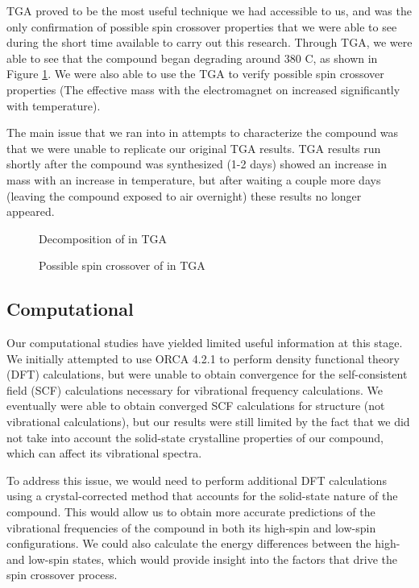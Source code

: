 \documentclass[journal=jacsat,manuscript=communication]{achemso}
\newcommand*\compound{\ch{Co(phen)2(NCS)2} }
\begin{document}
TGA proved to be the most useful technique we had accessible to us, and was the only confirmation of possible spin crossover properties that we were able to see during the short time available to carry out this research.  Through TGA, we were able to see that the compound began degrading around 380 \degree C, as shown in Figure \ref{fig:decomposition}. We were also able to use the TGA to verify possible spin crossover properties (The effective mass with the electromagnet on increased significantly with temperature).  

The main issue that we ran into in attempts to characterize the compound was that we were unable to replicate our original TGA results.  TGA results run shortly after the compound was synthesized (1-2 days) showed an increase in mass with an increase in temperature, but after waiting a couple more days (leaving the compound exposed to air overnight) these results no longer appeared.  

\begin{figure}
  \caption{Decomposition of \compound in TGA}
  \label{fig:decomposition}
\end{figure}

\begin{figure}
	\caption{Possible spin crossover of \compound in TGA}
	\label{fig:TGA_crossover}
\end{figure}

\subsection{Computational}

Our computational studies have yielded limited useful information at this stage. We initially attempted to use ORCA 4.2.1 to perform density functional theory (DFT) calculations, but were unable to obtain convergence for the self-consistent field (SCF) calculations necessary for vibrational frequency calculations. We eventually were able to obtain converged SCF calculations for structure (not vibrational calculations), but our results were still limited by the fact that we did not take into account the solid-state crystalline properties of our compound, which can affect its vibrational spectra.

To address this issue, we would need to perform additional DFT calculations using a crystal-corrected method that accounts for the solid-state nature of the compound. This would allow us to obtain more accurate predictions of the vibrational frequencies of the compound in both its high-spin and low-spin configurations. We could also calculate the energy differences between the high- and low-spin states, which would provide insight into the factors that drive the spin crossover process.
\end{document}
